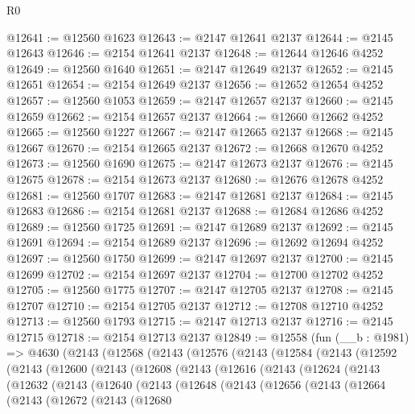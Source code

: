 \begin{lexlean}{R0}
\begin{coremodule}
@12641 := @12560 @1623
@12643 := @2147 @12641 @2137
@12644 := @2145 @12643
@12646 := @2154 @12641 @2137
@12648 := @12644 @12646 @4252
@12649 := @12560 @1640
@12651 := @2147 @12649 @2137
@12652 := @2145 @12651
@12654 := @2154 @12649 @2137
@12656 := @12652 @12654 @4252
@12657 := @12560 @1053
@12659 := @2147 @12657 @2137
@12660 := @2145 @12659
@12662 := @2154 @12657 @2137
@12664 := @12660 @12662 @4252
@12665 := @12560 @1227
@12667 := @2147 @12665 @2137
@12668 := @2145 @12667
@12670 := @2154 @12665 @2137
@12672 := @12668 @12670 @4252
@12673 := @12560 @1690
@12675 := @2147 @12673 @2137
@12676 := @2145 @12675
@12678 := @2154 @12673 @2137
@12680 := @12676 @12678 @4252
@12681 := @12560 @1707
@12683 := @2147 @12681 @2137
@12684 := @2145 @12683
@12686 := @2154 @12681 @2137
@12688 := @12684 @12686 @4252
@12689 := @12560 @1725
@12691 := @2147 @12689 @2137
@12692 := @2145 @12691
@12694 := @2154 @12689 @2137
@12696 := @12692 @12694 @4252
@12697 := @12560 @1750
@12699 := @2147 @12697 @2137
@12700 := @2145 @12699
@12702 := @2154 @12697 @2137
@12704 := @12700 @12702 @4252
@12705 := @12560 @1775
@12707 := @2147 @12705 @2137
@12708 := @2145 @12707
@12710 := @2154 @12705 @2137
@12712 := @12708 @12710 @4252
@12713 := @12560 @1793
@12715 := @2147 @12713 @2137
@12716 := @2145 @12715
@12718 := @2154 @12713 @2137
@12849 := @12558
    (fun (__b : @1981) =>
    @4630
      (@2143
        (@12568
          (@2143
            (@12576
              (@2143
                (@12584
                  (@2143
                    (@12592
                      (@2143
                        (@12600
                          (@2143
                            (@12608
                              (@2143
                                (@12616
                                  (@2143
                                    (@12624
                                      (@2143
                                        (@12632
                                          (@2143
                                            (@12640
                                              (@2143
                                                (@12648
                                                  (@2143
                                                    (@12656
                                                      (@2143
                                                        (@12664
                                                          (@2143
                                                            (@12672
                                                              (@2143
                                                                (@12680

\end{coremodule}
\end{lexlean}
